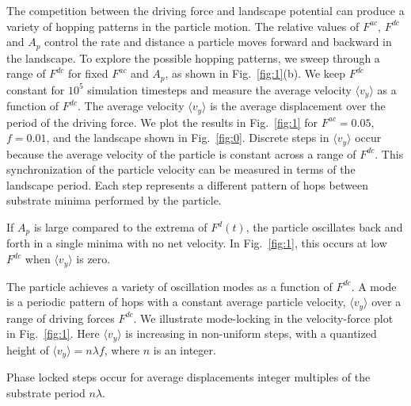 \documentclass[twocolumn,preprintnumbers,amsmath,amssymb,aps,prx]{revtex4}
\begin{document}
The competition between the driving force and landscape potential
can produce a variety of hopping patterns in the particle motion. 
%
The relative values of $F^{ac}$, $F^{dc}$ and $A_p$
control the rate and distance a  particle moves 
forward and backward in the landscape.
To explore the possible hopping patterns,
we sweep through a range of $F^{dc}$ for fixed $F^{ac}$ and $A_p$,
as shown in Fig.~\ref{fig:1}(b).
We keep $F^{dc}$ constant
for $10^5$ simulation timesteps
and 
measure the average velocity $\langle v_y \rangle $ 
as a function of $F^{dc}$.
The average velocity $\langle{v}_y\rangle$
is the average displacement %
over the period of the driving force.
We plot the results in Fig.~\ref{fig:1}
for $F^{ac} = 0.05$, $f=0.01$, and the landscape %
shown in Fig.~\ref{fig:0}.
Discrete steps in $\langle v_y \rangle$ occur because 
the average velocity of the particle
is constant across a range of $F^{dc}$.
This synchronization
of the particle velocity can be measured
in terms of the landscape period.
Each step represents a different pattern of hops
between substrate minima
performed by the particle.

If $A_p$ is large compared to the extrema of $F^{d}(t)$,
the particle oscillates back and forth
in a single minima
with no net velocity.
In Fig.~\ref{fig:1}, this occurs at 
low $F^{dc}$ when $\langle v_y \rangle$ is zero.

The particle 
achieves a variety of oscillation modes as a function of $F^{dc}$.
A mode is a periodic pattern of hops
with a constant average particle velocity, $\langle {v}_{y} \rangle$
over a range of driving forces $F^{dc}$.
We illustrate mode-locking in 
the velocity-force plot in Fig.~\ref{fig:1}.
Here $\langle v_{y} \rangle$ is increasing in non-uniform steps,
with a quantized height of
$\langle v_{y} \rangle = n \lambda f$,
where $n$ is an integer.  

Phase locked steps occur for average displacements integer
multiples of the substrate period $n\lambda$.
\end{document}
